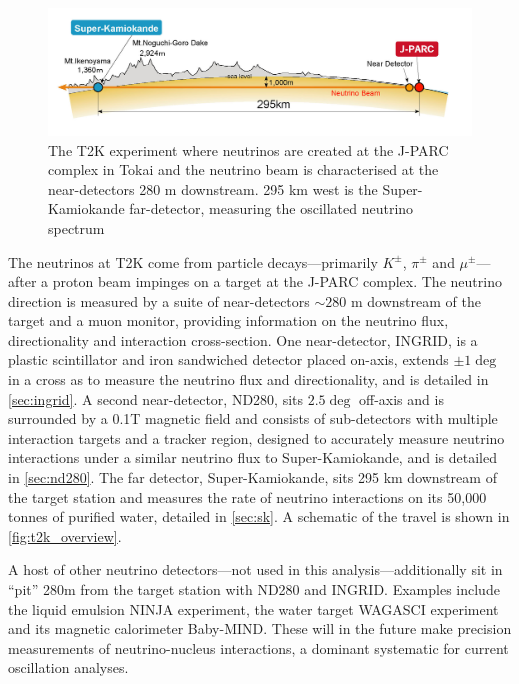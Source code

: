 \begin{figure}[h]
	\includegraphics[width=1.0\textwidth, trim={0mm 0mm 0mm 0mm}, clip,page=1]{figures/det_chap/view/t2k_overview}
	\caption{The T2K experiment where neutrinos are created at the J-PARC complex in Tokai and the neutrino beam is characterised at the near-detectors 280 m downstream. 295 km west is the Super-Kamiokande far-detector, measuring the oscillated neutrino spectrum}
	\label{fig:t2k_overview}
\end{figure}
The neutrinos at T2K come from particle decays---primarily $K^\pm$, $\pi^\pm$ and $\mu^\pm$---after a proton beam impinges on a target at the J-PARC complex. The neutrino direction is measured by a suite of near-detectors $\sim280$ m downstream of the target and a muon monitor, providing information on the neutrino flux, directionality and interaction cross-section. One near-detector, INGRID, is a plastic scintillator and iron sandwiched detector placed on-axis, extends $\pm1\deg$ in a cross as to measure the neutrino flux and directionality, and is detailed in \autoref{sec:ingrid}. A second near-detector, ND280, sits $2.5\deg$ off-axis and is surrounded by a 0.1T magnetic field and consists of sub-detectors with multiple interaction targets and a tracker region, designed to accurately measure neutrino interactions under a similar neutrino flux to Super-Kamiokande, and is detailed in \autoref{sec:nd280}. The far detector, Super-Kamiokande, sits 295 km downstream of the target station and measures the rate of neutrino interactions on its 50,000 tonnes of purified water, detailed in \autoref{sec:sk}. A schematic of the travel is shown in \autoref{fig:t2k_overview}.

A host of other neutrino detectors---not used in this analysis---additionally sit in ``pit'' 280m from the target station with ND280 and INGRID. Examples include the liquid emulsion NINJA experiment\cite{ninja}, the water target WAGASCI\cite{wagasci} experiment and its magnetic calorimeter Baby-MIND\cite{baby_mind}. These will in the future make precision measurements of neutrino-nucleus interactions, a dominant systematic for current oscillation analyses.

